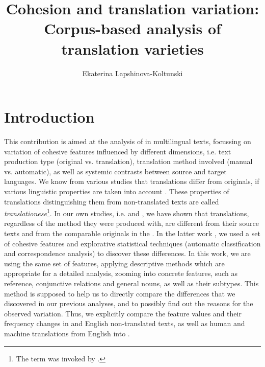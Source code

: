 \documentclass[output=paper]{langsci/langscibook.cls}
\author{Ekaterina Lapshinova-Koltunski \affiliation{Saarland University}}
\title{Cohesion and translation variation:
	Corpus-based analysis of translation varieties}
\begin{document}
\section{Introduction}
This contribution is aimed at the analysis of  in multilingual texts, focussing on variation of cohesive features influenced by different dimensions, i.e. text production type (original vs. translation), translation method involved (manual vs. automatic), as well as systemic contrasts between source and target languages. We know from various studies that translations differ from originals, if various linguistic properties are taken into account \citep[and others]{Baker1995,Teich2003,Croco2012}. These properties of translations distinguishing them from non-translated texts are called \textsl{translationese}\footnote{The term was invoked by \citet{Gellerstam:1986}.}. In our own studies, i.e. \citet{Lapshinova2015EST} and \citet{Lapshinova2015Disco}, we have shown that translations, regardless of the method they were produced with, are different from their source texts and from the comparable originals in the . In the latter work \citep{Lapshinova2015Disco}, we used a set of cohesive features and explorative statistical techniques (automatic classification and correspondence analysis) to discover these differences. In this work, we are using the same set of features, applying descriptive methods which are appropriate for a detailed analysis, zooming into concrete features, such as reference, conjunctive relations and general nouns, as well as their subtypes. This method is supposed to help us to directly compare the differences that we discovered in our previous analyses, and to possibly find out the reasons for the observed variation. Thus, we explicitly compare the feature values and their frequency changes in  and English non-translated texts, as well as human and machine translations from English into . 
\end{document}
